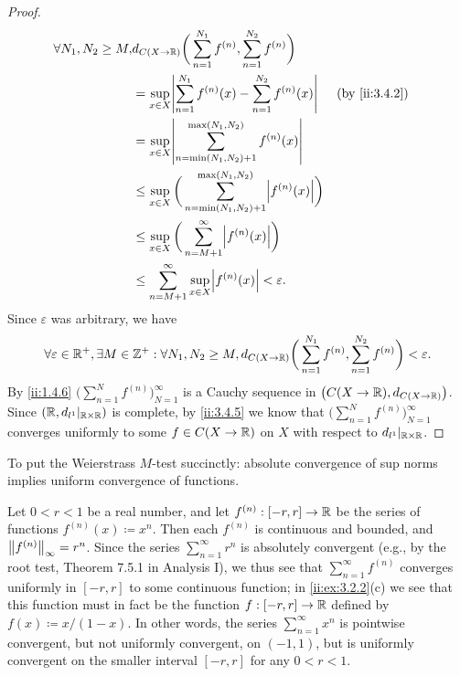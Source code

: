 \begin{proof}
  \begin{align*}
    \forall N_1, N_2 \geq M, & d_{C(X \to \R)}\bigg(\sum_{n = 1}^{N_1} f^{(n)}, \sum_{n = 1}^{N_2} f^{(n)}\bigg)                                  \\
                             & = \sup_{x \in X} \abs{\sum_{n = 1}^{N_1} f^{(n)}(x) - \sum_{n = 1}^{N_2} f^{(n)}(x)}            &  & \by{ii:3.4.2} \\
                             & = \sup_{x \in X} \abs{\sum_{n = \min(N_1, N_2) + 1}^{\max(N_1, N_2)} f^{(n)}(x)}                                   \\
                             & \leq \sup_{x \in X} \bigg(\sum_{n = \min(N_1, N_2) + 1}^{\max(N_1, N_2)} \abs{f^{(n)}(x)}\bigg)                    \\
                             & \leq \sup_{x \in X} \bigg(\sum_{n = M + 1}^\infty \abs{f^{(n)}(x)}\bigg)                                           \\
                             & \leq \sum_{n = M + 1}^\infty \sup_{x \in X} \abs{f^{(n)}(x)} < \varepsilon.
  \end{align*}
  Since \(\varepsilon\) was arbitrary, we have
  \[
    \forall \varepsilon \in \R^+, \exists M \in \Z^+ : \forall N_1, N_2 \geq M, d_{C(X \to \R)}\bigg(\sum_{n = 1}^{N_1} f^{(n)}, \sum_{n = 1}^{N_2} f^{(n)}\bigg) < \varepsilon.
  \]
  By \cref{ii:1.4.6} \(\bigg(\sum_{n = 1}^N f^{(n)}\bigg)_{N = 1}^\infty\) is a Cauchy sequence in \(\big(C(X \to \R), d_{C(X \to \R)}\big)\).
  Since \((\R, d_{l^1}|_{\R \times \R})\) is complete, by \cref{ii:3.4.5} we know that \(\bigg(\sum_{n = 1}^N f^{(n)}\bigg)_{N = 1}^\infty\) converges uniformly to some \(f \in C(X \to \R)\) on \(X\) with respect to \(d_{l^1}|_{\R \times \R}\).
\end{proof}

\begin{note}
  To put the Weierstrass \(M\)-test succinctly:
  absolute convergence of sup norms implies uniform convergence of functions.
\end{note}

\begin{eg}\label{ii:3.5.8}
  Let \(0 < r < 1\) be a real number, and let \(f^{(n)} : [-r, r] \to \R\) be the series of functions \(f^{(n)}(x) \coloneqq x^n\).
  Then each \(f^{(n)}\) is continuous and bounded, and \(\norm*{f^{(n)}}_\infty = r^n\).
  Since the series \(\sum_{n = 1}^\infty r^n\) is absolutely convergent (e.g., by the root test, Theorem 7.5.1 in Analysis I), we thus see that \(\sum_{n = 1}^\infty f^{(n)}\) converges uniformly in \([-r, r]\) to some continuous function;
  in \cref{ii:ex:3.2.2}(c) we see that this function must in fact be the function \(f : [-r, r] \to \R\) defined by \(f(x) \coloneqq x / (1 - x)\).
  In other words, the series \(\sum_{n = 1}^\infty x^n\) is pointwise convergent, but not uniformly convergent, on \((-1, 1)\), but is uniformly convergent on the smaller interval \([-r, r]\) for any \(0 < r < 1\).
\end{eg}

